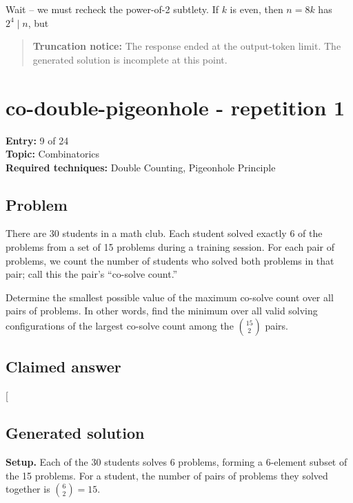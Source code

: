 \documentclass[
  11pt,
  letterpaper,
]{article}
\begin{document}
Wait -- we must recheck the power-of-2 subtlety. If \(k\) is even, then
\(n = 8k\) has \(2^4 \mid n\), but

\begin{quote}
\textbf{Truncation notice:} The response ended at the output-token
limit. The generated solution is incomplete at this point.
\end{quote}

\clearpage

\section{co-double-pigeonhole - repetition
1}\label{co-double-pigeonhole---repetition-1}

\textbf{Entry:} 9 of 24\\
\textbf{Topic:} Combinatorics\\
\textbf{Required techniques:} Double Counting, Pigeonhole Principle

\subsection{Problem}\label{problem-8}

There are 30 students in a math club. Each student solved exactly 6 of
the problems from a set of 15 problems during a training session. For
each pair of problems, we count the number of students who solved both
problems in that pair; call this the pair's ``co-solve count.''

Determine the smallest possible value of the maximum co-solve count over
all pairs of problems. In other words, find the minimum over all valid
solving configurations of the largest co-solve count among the
\(\binom{15}{2}\) pairs.

\subsection{Claimed answer}\label{claimed-answer-8}

{[}\boxed{9}{]}

\subsection{Generated solution}\label{generated-solution-8}

\textbf{Setup.} Each of the 30 students solves 6 problems, forming a
6-element subset of the 15 problems. For a student, the number of pairs
of problems they solved together is \(\binom{6}{2} = 15\).
\end{document}
